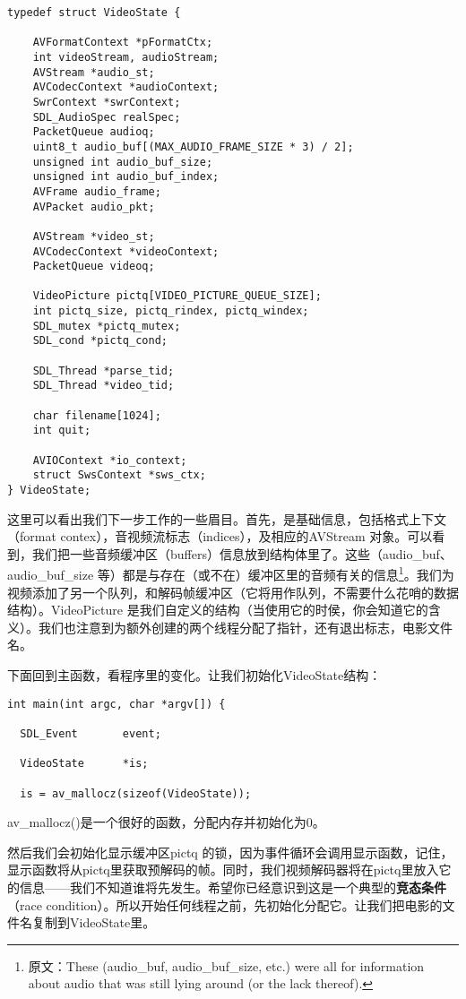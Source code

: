 \begin{lstlisting}
typedef struct VideoState {

    AVFormatContext *pFormatCtx;
    int videoStream, audioStream;
    AVStream *audio_st;
    AVCodecContext *audioContext;
    SwrContext *swrContext;
    SDL_AudioSpec realSpec;
    PacketQueue audioq;
    uint8_t audio_buf[(MAX_AUDIO_FRAME_SIZE * 3) / 2];
    unsigned int audio_buf_size;
    unsigned int audio_buf_index;
    AVFrame audio_frame;
    AVPacket audio_pkt;

    AVStream *video_st;
    AVCodecContext *videoContext;
    PacketQueue videoq;

    VideoPicture pictq[VIDEO_PICTURE_QUEUE_SIZE];
    int pictq_size, pictq_rindex, pictq_windex;
    SDL_mutex *pictq_mutex;
    SDL_cond *pictq_cond;

    SDL_Thread *parse_tid;
    SDL_Thread *video_tid;

    char filename[1024];
    int quit;

    AVIOContext *io_context;
    struct SwsContext *sws_ctx;
} VideoState;
\end{lstlisting}

这里可以看出我们下一步工作的一些眉目。首先，是基础信息，包括格式上下文（format contex），音视频流标志（indices），及相应的AVStream 对象。可以看到，我们把一些音频缓冲区（buffers）信息放到结构体里了。这些（audio_buf、 audio_buf_size 等）都是与存在（或不在）缓冲区里的音频有关的信息\footnote{原文：These (audio_buf, audio_buf_size, etc.) were all for information about audio that was still lying around (or the lack thereof).}。我们为视频添加了另一个队列，和解码帧缓冲区（它将用作队列，不需要什么花哨的数据结构）。VideoPicture 是我们自定义的结构（当使用它的时侯，你会知道它的含义）。我们也注意到为额外创建的两个线程分配了指针，还有退出标志，电影文件名。

下面回到主函数，看程序里的变化。让我们初始化VideoState结构：

\begin{lstlisting}
int main(int argc, char *argv[]) {

  SDL_Event       event;

  VideoState      *is;

  is = av_mallocz(sizeof(VideoState));
  \end{lstlisting}

av_mallocz()是一个很好的函数，分配内存并初始化为0。

然后我们会初始化显示缓冲区pictq 的锁，因为事件循环会调用显示函数，记住，显示函数将从pictq里获取预解码的帧。同时，我们视频解码器将在pictq里放入它的信息——我们不知道谁将先发生。希望你已经意识到这是一个典型的\textbf{竞态条件}（race condition）。所以开始任何线程之前，先初始化分配它。让我们把电影的文件名复制到VideoState里。

